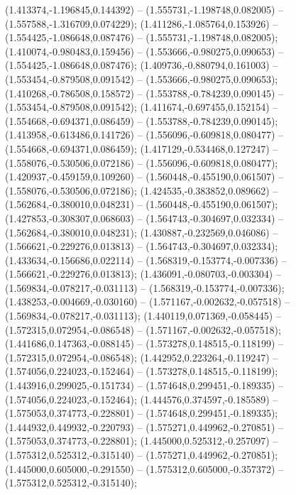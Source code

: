  (1.413374,-1.196845,0.144392) -- (1.555731,-1.198748,0.082005) -- (1.557588,-1.316709,0.074229);
 (1.411286,-1.085764,0.153926) -- (1.554425,-1.086648,0.087476) -- (1.555731,-1.198748,0.082005);
 (1.410074,-0.980483,0.159456) -- (1.553666,-0.980275,0.090653) -- (1.554425,-1.086648,0.087476);
 (1.409736,-0.880794,0.161003) -- (1.553454,-0.879508,0.091542) -- (1.553666,-0.980275,0.090653);
 (1.410268,-0.786508,0.158572) -- (1.553788,-0.784239,0.090145) -- (1.553454,-0.879508,0.091542);
 (1.411674,-0.697455,0.152154) -- (1.554668,-0.694371,0.086459) -- (1.553788,-0.784239,0.090145);
 (1.413958,-0.613486,0.141726) -- (1.556096,-0.609818,0.080477) -- (1.554668,-0.694371,0.086459);
 (1.417129,-0.534468,0.127247) -- (1.558076,-0.530506,0.072186) -- (1.556096,-0.609818,0.080477);
 (1.420937,-0.459159,0.109260) -- (1.560448,-0.455190,0.061507) -- (1.558076,-0.530506,0.072186);
 (1.424535,-0.383852,0.089662) -- (1.562684,-0.380010,0.048231) -- (1.560448,-0.455190,0.061507);
 (1.427853,-0.308307,0.068603) -- (1.564743,-0.304697,0.032334) -- (1.562684,-0.380010,0.048231);
 (1.430887,-0.232569,0.046086) -- (1.566621,-0.229276,0.013813) -- (1.564743,-0.304697,0.032334);
 (1.433634,-0.156686,0.022114) -- (1.568319,-0.153774,-0.007336) -- (1.566621,-0.229276,0.013813);
 (1.436091,-0.080703,-0.003304) -- (1.569834,-0.078217,-0.031113) -- (1.568319,-0.153774,-0.007336);
 (1.438253,-0.004669,-0.030160) -- (1.571167,-0.002632,-0.057518) -- (1.569834,-0.078217,-0.031113);
 (1.440119,0.071369,-0.058445) -- (1.572315,0.072954,-0.086548) -- (1.571167,-0.002632,-0.057518);
 (1.441686,0.147363,-0.088145) -- (1.573278,0.148515,-0.118199) -- (1.572315,0.072954,-0.086548);
 (1.442952,0.223264,-0.119247) -- (1.574056,0.224023,-0.152464) -- (1.573278,0.148515,-0.118199);
 (1.443916,0.299025,-0.151734) -- (1.574648,0.299451,-0.189335) -- (1.574056,0.224023,-0.152464);
 (1.444576,0.374597,-0.185589) -- (1.575053,0.374773,-0.228801) -- (1.574648,0.299451,-0.189335);
 (1.444932,0.449932,-0.220793) -- (1.575271,0.449962,-0.270851) -- (1.575053,0.374773,-0.228801);
 (1.445000,0.525312,-0.257097) -- (1.575312,0.525312,-0.315140) -- (1.575271,0.449962,-0.270851);
 (1.445000,0.605000,-0.291550) -- (1.575312,0.605000,-0.357372) -- (1.575312,0.525312,-0.315140);

